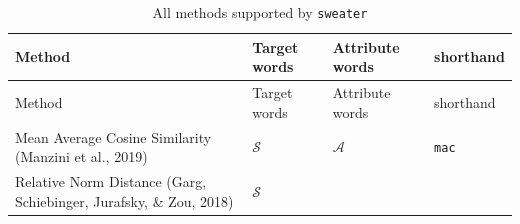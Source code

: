 \documentclass[english,man]{apa6}
\begin{document}
\begin{longtable}[]{@{}llll@{}}
\caption{\label{tab:t1} All methods supported by \texttt{sweater}}\tabularnewline
\toprule
\begin{minipage}[b]{0.39\columnwidth}\raggedright
Method\strut
\end{minipage} & \begin{minipage}[b]{0.21\columnwidth}\raggedright
Target words\strut
\end{minipage} & \begin{minipage}[b]{0.21\columnwidth}\raggedright
Attribute words\strut
\end{minipage} & \begin{minipage}[b]{0.08\columnwidth}\raggedright
shorthand\strut
\end{minipage}\tabularnewline
\midrule
\endfirsthead
\toprule
\begin{minipage}[b]{0.39\columnwidth}\raggedright
Method\strut
\end{minipage} & \begin{minipage}[b]{0.21\columnwidth}\raggedright
Target words\strut
\end{minipage} & \begin{minipage}[b]{0.21\columnwidth}\raggedright
Attribute words\strut
\end{minipage} & \begin{minipage}[b]{0.08\columnwidth}\raggedright
shorthand\strut
\end{minipage}\tabularnewline
\midrule
\endhead
\begin{minipage}[t]{0.39\columnwidth}\raggedright
Mean Average Cosine Similarity (Manzini et al., 2019)\strut
\end{minipage} & \begin{minipage}[t]{0.21\columnwidth}\raggedright
\(\mathcal{S}\)\strut
\end{minipage} & \begin{minipage}[t]{0.21\columnwidth}\raggedright
\(\mathcal{A}\)\strut
\end{minipage} & \begin{minipage}[t]{0.08\columnwidth}\raggedright
\texttt{mac}\strut
\end{minipage}\tabularnewline
\begin{minipage}[t]{0.39\columnwidth}\raggedright
Relative Norm Distance (Garg, Schiebinger, Jurafsky, \& Zou, 2018)\strut
\end{minipage} & \begin{minipage}[t]{0.21\columnwidth}\raggedright
\(\mathcal{S}\)\strut

\end{minipage}
\end{longtable}
\end{document}
